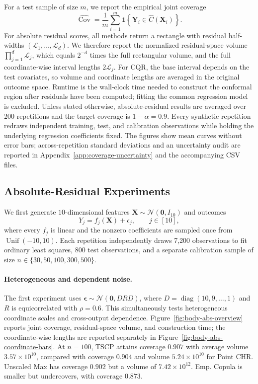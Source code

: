 For a test sample of size $m$, we report the empirical joint coverage
\[
  \widehat{\operatorname{Cov}}
  = \frac{1}{m}\sum_{i=1}^{m}
    \mathbf{1}\!\left\{\boldsymbol{Y}_i
    \in \widehat{C}(\boldsymbol{X}_i)\right\}.
\]
For absolute residual scores, all methods return a rectangle with residual
half-widths $(\mathcal{L}_1,\ldots,\mathcal{L}_d)$. We therefore report the normalized
residual-space volume $\prod_{j=1}^{d}\mathcal{L}_j$, which equals $2^{-d}$ times the
full rectangular volume, and the full coordinate-wise interval lengths
$2\mathcal{L}_j$. For CQR, the base interval depends on the test covariates, so volume
and coordinate lengths are averaged in the original outcome space. Runtime is
the wall-clock time needed to construct the conformal region after residuals
have been computed; fitting the common regression model is excluded. Unless
stated otherwise, absolute-residual results are averaged over 200 repetitions
and the target coverage is $1-\alpha=0.9$. Every synthetic repetition redraws
independent training, test, and calibration observations while holding the
underlying regression coefficients fixed. The figures show mean curves
without error bars; across-repetition standard deviations and an uncertainty
audit are reported in Appendix~\ref{app:coverage-uncertainty} and the
accompanying CSV files.

\subsection{Absolute-Residual Experiments}
\label{sec:absolute-residual-experiments}

We first generate $10$-dimensional features
$\boldsymbol{X}\sim\mathcal{N}(\boldsymbol{0},I_{10})$ and outcomes
\[
  Y_j = f_j(\boldsymbol{X}) + \epsilon_j,
  \qquad j\in[10],
\]
where every $f_j$ is linear and the nonzero coefficients are sampled once
from $\operatorname{Unif}(-10,10)$. Each repetition independently draws 7,200
observations to fit ordinary least squares, 800 test observations, and a
separate calibration sample of size
$n\in\{30,50,100,300,500\}$.

\paragraph{Heterogeneous and dependent noise.}
The first experiment uses
$\boldsymbol{\epsilon}\sim\mathcal{N}(\boldsymbol{0},DRD)$, where
$D=\operatorname{diag}(10,9,\ldots,1)$ and $R$ is equicorrelated with
$\rho=0.6$. This simultaneously tests heterogeneous coordinate scales and
cross-output dependence. Figure~\ref{fig:body-abs-overview} reports joint
coverage, residual-space volume, and construction time; the coordinate-wise
lengths are reported separately in Figure~\ref{fig:body-abs-coordinate-bars}. At $n=100$, TSCP attains coverage $0.907$ with average volume
$3.57\times10^{10}$, compared with coverage $0.904$ and volume
$5.24\times10^{10}$ for Point CHR. Unscaled Max has coverage $0.902$ but a
volume of $7.42\times10^{12}$. Emp. Copula is smaller but undercovers, with
coverage $0.873$.

